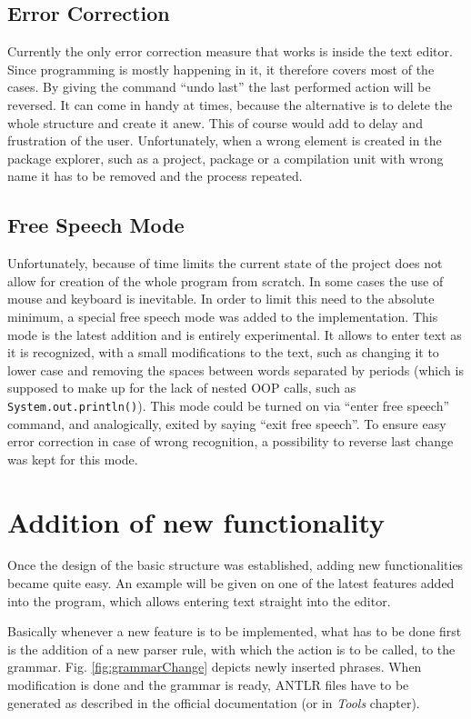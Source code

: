 \subsection{Error Correction}
Currently the only error correction measure that works is inside the text editor. Since programming is mostly happening in it, it therefore covers most of the cases. By giving the command ``undo last'' the last performed action will be reversed. It can come in handy at times, because the alternative is to delete the whole structure and create it anew. This of course would add to delay and frustration of the user. Unfortunately, when a wrong element is created in the package explorer, such as a project, package or a compilation unit with wrong name it has to be removed and the process repeated.

\subsection{Free Speech Mode}

Unfortunately, because of time limits the current state of the project does not allow for creation of the whole program from scratch. In some cases the use of mouse and keyboard is inevitable. In order to limit this need to the absolute minimum, a special free speech mode was added to the implementation. This mode is the latest addition and is entirely experimental. It allows to enter text as it is recognized, with a small modifications to the text, such as changing it to lower case and removing the spaces between words separated by periods (which is supposed to make up for the lack of nested OOP calls, such as \texttt{System.out.println()}). This mode could be turned on via ``enter free speech'' command, and analogically, exited by saying ``exit free speech''. To ensure easy error correction in case of wrong recognition, a possibility to reverse last change was kept for this mode.

\section{Addition of new functionality}

Once the design of the basic structure was established, adding new functionalities became quite easy. An example will be given on one of the latest features added into the program, which allows entering text straight into the editor. 

Basically whenever a new feature is to be implemented, what has to be done first is the addition of a new parser rule, with which the action is to be called, to the grammar. Fig. \ref{fig:grammarChange} depicts newly inserted phrases. When modification is done and the grammar is ready, ANTLR files have to be generated as described in the official documentation (or in \textit{Tools} chapter). 

